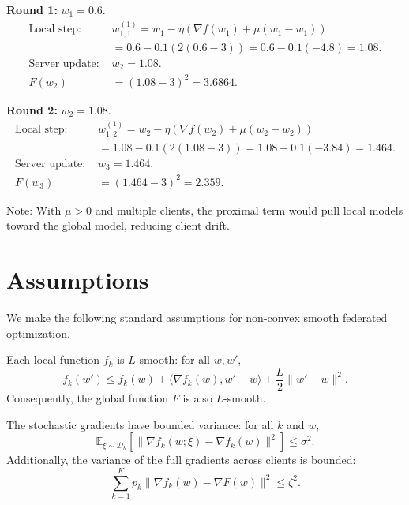 \documentclass{article}
\begin{document}
\textbf{Round 1:} $w_1 = 0.6$.
\begin{align*}
    \text{Local step: } & w_{1,1}^{(1)} = w_1 - \eta \left( \nabla f(w_1) + \mu (w_1 - w_1) \right) \\
    &= 0.6 - 0.1 \left( 2(0.6-3) \right) = 0.6 - 0.1(-4.8) = 1.08. \\
    \text{Server update: } & w_2 = 1.08. \\
    F(w_2) &= (1.08-3)^2 = 3.6864.
\end{align*}

\textbf{Round 2:} $w_2 = 1.08$.
\begin{align*}
    \text{Local step: } & w_{1,2}^{(1)} = w_2 - \eta \left( \nabla f(w_2) + \mu (w_2 - w_2) \right) \\
    &= 1.08 - 0.1 \left( 2(1.08-3) \right) = 1.08 - 0.1(-3.84) = 1.464. \\
    \text{Server update: } & w_3 = 1.464. \\
    F(w_3) &= (1.464-3)^2 = 2.359.
\end{align*}

Note: With $\mu>0$ and multiple clients, the proximal term would pull local models toward the global model, reducing client drift.

\section*{Assumptions}

We make the following standard assumptions for non-convex smooth federated optimization.

\begin{assumption}[L-Smoothness] \label{asm:smooth}
    Each local function $f_k$ is $L$-smooth: for all $w, w'$,
    \begin{equation}
        f_k(w') \leq f_k(w) + \langle \nabla f_k(w), w' - w \rangle + \frac{L}{2} \| w' - w \|^2.
    \end{equation}
    Consequently, the global function $F$ is also $L$-smooth.
\end{assumption}

\begin{assumption} \label{asm:variance}
    The stochastic gradients have bounded variance: for all $k$ and $w$,
    \begin{equation}
        \mathbb{E}_{\xi \sim \mathcal{D}_k} \left[ \| \nabla f_k(w; \xi) - \nabla f_k(w) \|^2 \right] \leq \sigma^2.
    \end{equation}
    Additionally, the variance of the full gradients across clients is bounded:
    \begin{equation}
        \sum_{k=1}^K p_k \| \nabla f_k(w) - \nabla F(w) \|^2 \leq \zeta^2.
    \end{equation}
\end{assumption}
\end{document}
